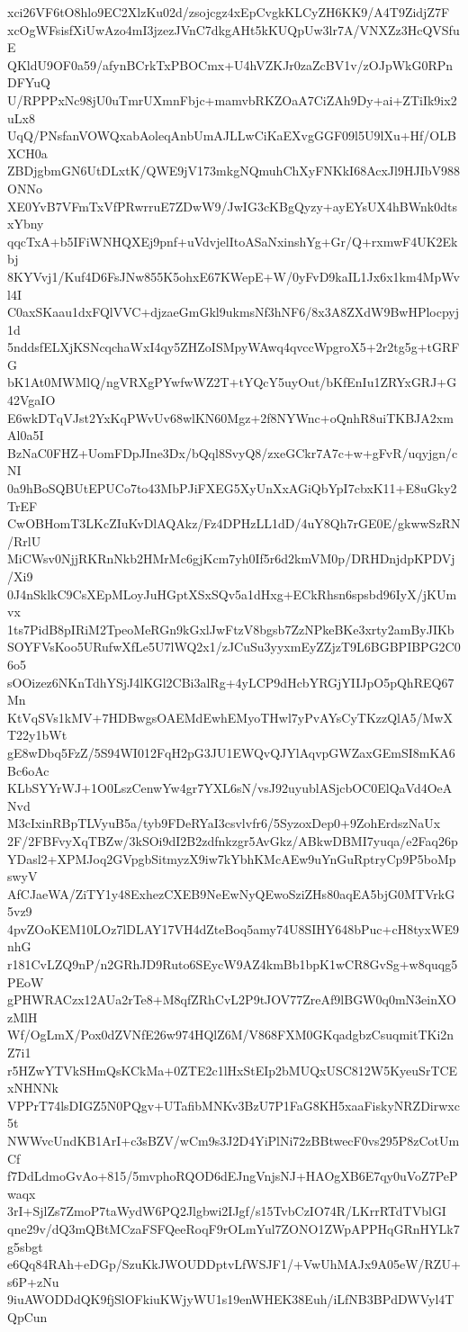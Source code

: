 xci26VF6tO8hlo9EC2XlzKu02d/zsojcgz4xEpCvgkKLCyZH6KK9/A4T9ZidjZ7F
xcOgWFsisfXiUwAzo4mI3jzezJVnC7dkgAHt5kKUQpUw3lr7A/VNXZz3HcQVSfuE
QKldU9OF0a59/afynBCrkTxPBOCmx+U4hVZKJr0zaZcBV1v/zOJpWkG0RPnDFYuQ
U/RPPPxNc98jU0uTmrUXmnFbjc+mamvbRKZOaA7CiZAh9Dy+ai+ZTiIk9ix2uLx8
UqQ/PNsfanVOWQxabAoleqAnbUmAJLLwCiKaEXvgGGF09l5U9lXu+Hf/OLBXCH0a
ZBDjgbmGN6UtDLxtK/QWE9jV173mkgNQmuhChXyFNKkI68AcxJl9HJIbV988ONNo
XE0YvB7VFmTxVfPRwrruE7ZDwW9/JwIG3cKBgQyzy+ayEYsUX4hBWnk0dtsxYbny
qqcTxA+b5IFiWNHQXEj9pnf+uVdvjelItoASaNxinshYg+Gr/Q+rxmwF4UK2Ekbj
8KYVvj1/Kuf4D6FsJNw855K5ohxE67KWepE+W/0yFvD9kaIL1Jx6x1km4MpWvl4I
C0axSKaau1dxFQlVVC+djzaeGmGkl9ukmsNf3hNF6/8x3A8ZXdW9BwHPlocpyj1d
5nddsfELXjKSNcqchaWxI4qy5ZHZoISMpyWAwq4qvccWpgroX5+2r2tg5g+tGRFG
bK1At0MWMlQ/ngVRXgPYwfwWZ2T+tYQcY5uyOut/bKfEnIu1ZRYxGRJ+G42VgaIO
E6wkDTqVJst2YxKqPWvUv68wlKN60Mgz+2f8NYWnc+oQnhR8uiTKBJA2xmAl0a5I
BzNaC0FHZ+UomFDpJIne3Dx/bQql8SvyQ8/zxeGCkr7A7c+w+gFvR/uqyjgn/cNI
0a9hBoSQBUtEPUCo7to43MbPJiFXEG5XyUnXxAGiQbYpI7cbxK11+E8uGky2TrEF
CwOBHomT3LKcZIuKvDlAQAkz/Fz4DPHzLL1dD/4uY8Qh7rGE0E/gkwwSzRN/RrlU
MiCWsv0NjjRKRnNkb2HMrMc6gjKcm7yh0If5r6d2kmVM0p/DRHDnjdpKPDVj/Xi9
0J4nSklkC9CsXEpMLoyJuHGptXSxSQv5a1dHxg+ECkRhsn6spsbd96IyX/jKUmvx
1ts7PidB8pIRiM2TpeoMeRGn9kGxlJwFtzV8bgsb7ZzNPkeBKe3xrty2amByJIKb
SOYFVsKoo5URufwXfLe5U7lWQ2x1/zJCuSu3yyxmEyZZjzT9L6BGBPIBPG2C06o5
sOOizez6NKnTdhYSjJ4lKGl2CBi3alRg+4yLCP9dHcbYRGjYIIJpO5pQhREQ67Mn
KtVqSVs1kMV+7HDBwgsOAEMdEwhEMyoTHwl7yPvAYsCyTKzzQlA5/MwXT22y1bWt
gE8wDbq5FzZ/5S94WI012FqH2pG3JU1EWQvQJYlAqvpGWZaxGEmSI8mKA6Bc6oAc
KLbSYYrWJ+1O0LszCenwYw4gr7YXL6sN/vsJ92uyublASjcbOC0ElQaVd4OeANvd
M3cIxinRBpTLVyuB5a/tyb9FDeRYaI3csvlvfr6/5SyzoxDep0+9ZohErdszNaUx
2F/2FBFvyXqTBZw/3kSOi9dI2B2zdfnkzgr5AvGkz/ABkwDBMI7yuqa/e2Faq26p
YDasl2+XPMJoq2GVpgbSitmyzX9iw7kYbhKMcAEw9uYnGuRptryCp9P5boMpswyV
AfCJaeWA/ZiTY1y48ExhezCXEB9NeEwNyQEwoSziZHs80aqEA5bjG0MTVrkG5vz9
4pvZOoKEM10LOz7lDLAY17VH4dZteBoq5amy74U8SIHY648bPuc+cH8tyxWE9nhG
r181CvLZQ9nP/n2GRhJD9Ruto6SEycW9AZ4kmBb1bpK1wCR8GvSg+w8quqg5PEoW
gPHWRACzx12AUa2rTe8+M8qfZRhCvL2P9tJOV77ZreAf9lBGW0q0mN3einXOzMlH
Wf/OgLmX/Pox0dZVNfE26w974HQlZ6M/V868FXM0GKqadgbzCsuqmitTKi2nZ7i1
r5HZwYTVkSHmQsKCkMa+0ZTE2c1lHxStEIp2bMUQxUSC812W5KyeuSrTCExNHNNk
VPPrT74lsDIGZ5N0PQgv+UTafibMNKv3BzU7P1FaG8KH5xaaFiskyNRZDirwxc5t
NWWvcUndKB1ArI+c3sBZV/wCm9s3J2D4YiPlNi72zBBtwecF0vs295P8zCotUmCf
f7DdLdmoGvAo+815/5mvphoRQOD6dEJngVnjsNJ+HAOgXB6E7qy0uVoZ7PePwaqx
3rI+SjlZs7ZmoP7taWydW6PQ2Jlgbwi2IJgf/s15TvbCzIO74R/LKrrRTdTVblGI
qne29v/dQ3mQBtMCzaFSFQeeRoqF9rOLmYul7ZONO1ZWpAPPHqGRnHYLk7g5sbgt
e6Qq84RAh+eDGp/SzuKkJWOUDDptvLfWSJF1/+VwUhMAJx9A05eW/RZU+s6P+zNu
9iuAWODDdQK9fjSlOFkiuKWjyWU1s19enWHEK38Euh/iLfNB3BPdDWVyl4TQpCun
